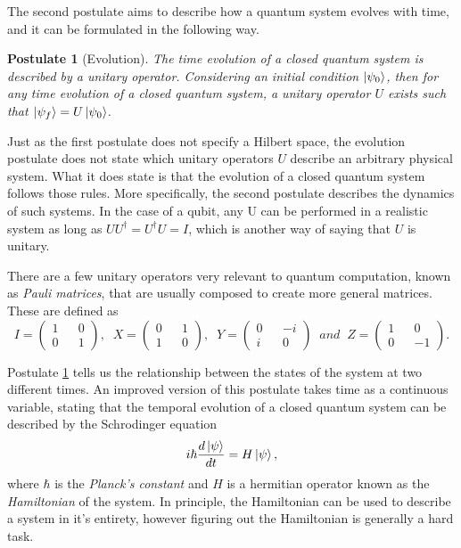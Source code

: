 \documentclass[../../dissertation.tex]{subfiles}
\newtheorem{post}{Postulate}
\begin{document}
The second postulate aims to describe how a quantum system evolves with time,
and it can be formulated in the following way. 
\begin{post}[Evolution]
	\label{post:evolution}
	The time evolution of a closed quantum system is described by a unitary
	operator. Considering an initial condition $\ket{\psi_0}$, then for any
	time evolution of a closed quantum system, a unitary operator $U$ exists
	such that $\ket{\psi_f}=U\ket{\psi_0}$.\par
\end{post}
Just as the first postulate does not specify a Hilbert space, the evolution
postulate does not state which unitary operators $U$ describe an arbitrary
physical system. What it does state is that the evolution of a closed quantum
system follows those rules. More specifically, the second postulate describes
the dynamics of such systems. In the case of a qubit, any U can be performed in
a realistic system as long as $U U^\dag = U^\dag U = I$, which is another way
of saying that $U$ is unitary.\par  
There are a few unitary operators very relevant to quantum computation, known
as \textit{Pauli matrices}, that are usually composed to create more general
matrices. These are defined as
\begin{equation}
	I = \begin{pmatrix} 
		1 && 0\\
		0 && 1
	    \end{pmatrix}, \; \;
	X = \begin{pmatrix} 
		0 && 1\\
		1 && 0
	    \end{pmatrix}, \; \;
	Y = \begin{pmatrix} 
		0 && -i\\
		i && 0
	    \end{pmatrix} \;\; and \; \;
	Z = \begin{pmatrix} 
		1 && 0\\
		0 && -1
	    \end{pmatrix}.
\end{equation}\par
Postulate \ref{post:evolution} tells us the relationship between the states of
the system at two different times. An improved version of this postulate takes
time as a continuous variable, stating that the temporal evolution of a closed
quantum system can be described by the Schrodinger equation 
\begin{equation}
	i \hbar \frac{d\ket{\psi}}{dt} = H \ket{\psi},
\end{equation}
where $\hbar$ is the \textit{Planck's constant} and $H$ is a hermitian operator
known as the \textit{Hamiltonian} of the system. In principle, the Hamiltonian
can be used to describe a system in it's entirety, however figuring out the
Hamiltonian is generally a hard task.\par
\end{document}
